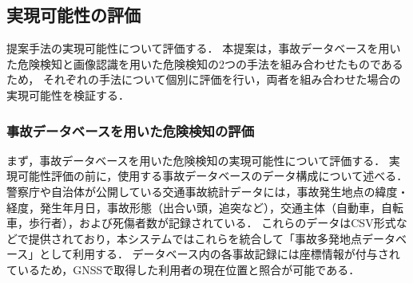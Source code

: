 \documentclass[uplatex,dvipdfmx]{jsarticle}
\begin{document}
\subsection{実現可能性の評価}
提案手法の実現可能性について評価する．
本提案は，事故データベースを用いた危険検知と画像認識を用いた危険検知の2つの手法を組み合わせたものであるため，
それぞれの手法について個別に評価を行い，両者を組み合わせた場合の実現可能性を検証する．

\subsubsection{事故データベースを用いた危険検知の評価}
まず，事故データベースを用いた危険検知の実現可能性について評価する．
実現可能性評価の前に，使用する事故データベースのデータ構成について述べる．
警察庁や自治体が公開している交通事故統計データには，事故発生地点の緯度・経度，発生年月日，事故形態（出合い頭，追突など），交通主体（自動車，自転車，歩行者），および死傷者数が記録されている．
これらのデータはCSV形式などで提供されており，本システムではこれらを統合して「事故多発地点データベース」として利用する．
データベース内の各事故記録には座標情報が付与されているため，GNSSで取得した利用者の現在位置と照合が可能である．
\end{document}
